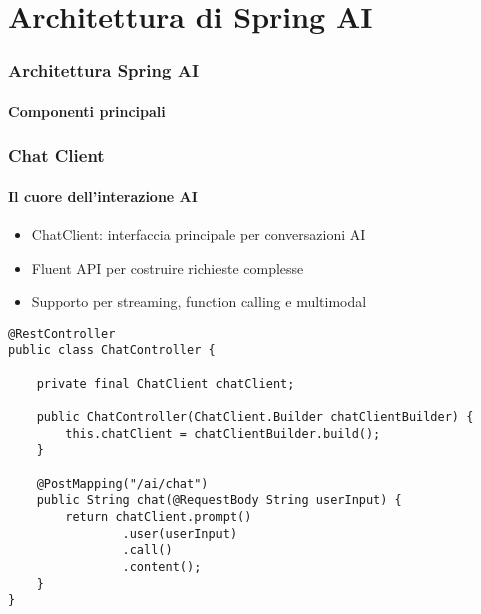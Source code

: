 \section{Architettura di Spring AI} %
\label{sec:spring_ai_architecture}
%
\begin{frame}[t,fragile] \frametitle{Architettura Spring AI}
    \framesubtitle{Componenti principali}
    \vspace*{-10pt}
\end{frame}
%
%
\begin{frame}[t,fragile] \frametitle{Chat Client}
	{\small
		\framesubtitle{Il cuore dell'interazione AI}
		\begin{itemize}[leftmargin=10pt,align=right]
			\onslide<2->\item[\alert{\faArrowCircleRight}] \alert{ChatClient:} interfaccia principale per conversazioni AI
			\onslide<3->\item[\alert{\faArrowCircleRight}] \alert{Fluent API} per costruire richieste complesse
			\onslide<4->\item[\alert{\faArrowCircleRight}] Supporto per \alert{streaming}, \alert{function calling} e \alert{multimodal}
		\end{itemize}
		\vspace*{.3cm}
\begin{verbatim}
@RestController
public class ChatController {
    
    private final ChatClient chatClient;
    
    public ChatController(ChatClient.Builder chatClientBuilder) {
        this.chatClient = chatClientBuilder.build();
    }
    
    @PostMapping("/ai/chat")
    public String chat(@RequestBody String userInput) {
        return chatClient.prompt()
                .user(userInput)
                .call()
                .content();
    }
}
\end{verbatim}
	}
\end{frame}
%
